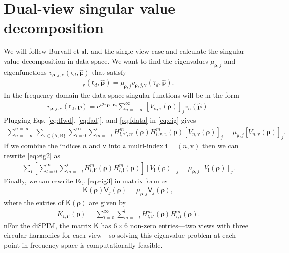 \documentclass[11pt]{article}
\newcommand{\me}{\mathrm{e}}
\providecommand{\mb}[1]{\mathbf{#1}}
\providecommand{\mc}[1]{\mathcal{#1}}
\providecommand{\rd}{\mathbf{\mathfrak{r}}_d}
\providecommand{\mh}[1]{\mathbf{\hat{#1}}}
\providecommand{\ms}[1]{\mathsf{#1}}
\providecommand{\bs}[1]{\boldsymbol{#1}}
\providecommand{\tv}{\text{v}}
\providecommand{\tx}[1]{\text{#1}}
\providecommand{\bp}{\bs{\rho}}
\providecommand{\p}{\mh{p}}
\providecommand{\lmsum}{\sum_{l=0}^\infty\sum_{m=-l}^{l}}
\begin{document}
\section{Dual-view singular value decomposition}
We will follow Burvall et al. \cite{burvall06} and the single-view case and
calculate the singular value decomposition in data space. We want to find the
eigenvalues $\mu_{\bp, j}$ and eigenfunctions $v_{\bp, j, \tv}(\rd, \p)$ that
satisfy
\begin{align}
  [\mc{H}\mc{H}^\dagger \mb{v}_{\bp, j}]_{\tv}(\rd, \p) = \mu_{\bp, j}v_{\bp, j, \tv}(\rd, \p). \label{eq:eig}
\end{align}
In the frequency domain the data-space singular functions will be in the form
\begin{align}
  v_{\bp, j, \tv}(\rd, \p) = \me^{i2\pi\bp\cdot\rd} \sum_{n=-\infty}^{\infty} \left[V_{n, \tv}(\bp)\right]_j z_n(\p). \label{eq:fdata}
\end{align}
Plugging Eqs. \ref{eq:ffwd}, \ref{eq:fadj}, and \ref{eq:fdata} in \ref{eq:eig} gives
\begin{align}
  \sum_{n=-\infty}^{n=\infty} \sum_{\tv \in \{\tx{A}, \tx{B}\}} \lmsum H_{l,\tv',n'}^m(\bp)H_{l,\tv,n}^m(\bp)\left[V_{n, \tv}(\bp)\right]_j = \mu_{\bp, j}\left[V_{n, \tv}(\bp)\right]_j. \label{eq:eig2}
\end{align}
If we combine the indices $n$ and $\tv$ into a multi-index $\mb{i} = (n, \tv)$ then we
can rewrite \ref{eq:eig2} as
\begin{align}
  \sum_{\mb{i}} \left[\lmsum H_{l,\mb{i}'}^m(\bp)H_{l,\mb{i}}^m(\bp)\right]\left[V_{\mb{i}}(\bp)\right]_j = \mu_{\bp, j}\left[V_{\mb{i}}(\bp)\right]_j. \label{eq:eig3}
\end{align}
Finally, we can rewrite Eq. \ref{eq:eig3} in matrix form as
\begin{align}
  \ms{K}(\bp)\ms{V}_j(\bp) = \mu_{\bp, j}\ms{V}_j(\bp),
\end{align}
where the entries of $\ms{K}(\bp)$ are given by
\begin{align}
  K_{\mb{i}, \mb{i}'} (\bp) = \lmsum H_{l,\mb{i}'}^m(\bp)H_{l,\mb{i}}^m(\bp). 
\end{align}
nFor the diSPIM, the matrix $\mathsf{K}$ has $6\times 6$ non-zero entries---two
views with three circular harmonics for each view---so solving this eigenvalue
problem at each point in frequency space is computationally feasible.



{}

\end{document}
